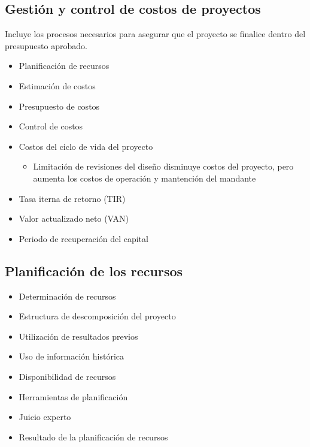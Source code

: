 \documentclass{article} %
\begin{document}
\subsection{Gestión y control de costos de proyectos}
Incluye los procesos necesarios para asegurar que el proyecto se finalice dentro del presupuesto aprobado.
\begin{itemize}
    \item Planificación de recursos
    \item Estimación de costos
    \item Presupuesto de costos
    \item Control de costos
    \item Costos del ciclo de vida del proyecto
    \begin{itemize}
        \item Limitación de revisiones del diseño disminuye costos del proyecto, pero aumenta los costos de operación y mantención del mandante
    \end{itemize}
    \item Tasa iterna de retorno (TIR)
    \item Valor actualizado neto (VAN)
    \item Periodo de recuperación del capital
\end{itemize}

\subsection{Planificación de los recursos}
\begin{itemize}
    \item Determinación de recursos
    \item Estructura de descomposición del proyecto
    \item Utilización de resultados previos
    \item Uso de información histórica
    \item Disponibilidad de recursos
    \item Herramientas de planificación
    \item Juicio experto
    \item Resultado de la planificación de recursos
\end{itemize}
\end{document}
